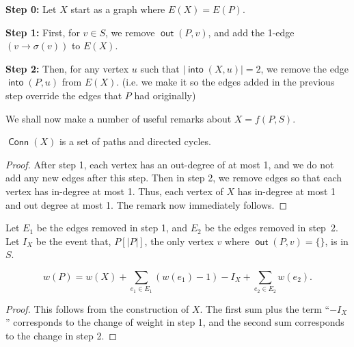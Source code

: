 \documentclass{article}
\DeclareMathOperator{\out}{\bm{\mathsf{out}}}
\DeclareMathOperator{\into}{\bm{\mathsf{into}}}
\DeclareMathOperator{\Conn}{\bm{\mathsf{Conn}}}
\newcommand{\dc}[1]{}%
\begin{document}
\textbf{Step 0:} Let $X$ start as a graph where $E(X) = E(P)$.

\textbf{Step 1:} First, for $v \in S$, we remove $\out(P,v)$, and add the 1-edge $(v \to \sigma(v))$ to $E(X)$. 

\textbf{Step 2:} Then, for any vertex $u$ such that $|\into(X,u)| = 2$, we remove the edge $\into(P,u)$ from $E(X)$. (i.e. we make it so the edges added in the previous step override the edges that $P$ had originally)

\dc{Another thought: you can split step 1 into two steps or refactor, so it is either (1) add the 1-edge, (2) remove out-edges, (3) remove in-edges; or (1) add the 1-edge, (2) remove original edges until $X$ has only in-/out-degree $\le1$ vertices, which is to remove [this set of out-edges] and [this set of in-edges]. The benefit of doing this is that it is more obvious what the construction accomplishes and it makes Remark 1 more obvious.}

\vspace{1.75em}

We shall now make a number of useful remarks about $X=f(P,S)$\dc{, which will allow us to ...}.

\vspace{1.75em}

\begin{rmk} \label{degree rule} $\Conn(X)$ is a set of paths and directed cycles.
\begin{proof}
After step 1, each vertex has an out-degree of at most 1, and we do not add any new edges after this step. Then in step 2, we remove edges so that each vertex has in-degree at most 1. Thus, each vertex of $X$ has in-degree at most 1 and out degree at most 1. The remark now immediately follows.
\end{proof}
\end{rmk}

\vspace{1.75em}

Let $E_1$ be the edges removed in step 1, and $E_2$ be the edges removed in step~2. Let $I_X$ be the event that, $P[|P|]$, the only vertex $v$ where $\out(P,v) = \{\}$, is in $S$.

\begin{rmk}\label{eqq}

\[w(P) = w(X) + \sum_{e_1 \in E_1} (w(e_1)-1)-I_X + \sum_{e_2 \in E_2} w(e_2).\]

\begin{proof}
This follows from the construction of $X$. The first sum plus the term ``$-I_X$'' corresponds to the change of weight in step 1, and the second sum corresponds to the change in step 2.
\end{proof}

\end{rmk}
\end{document}
